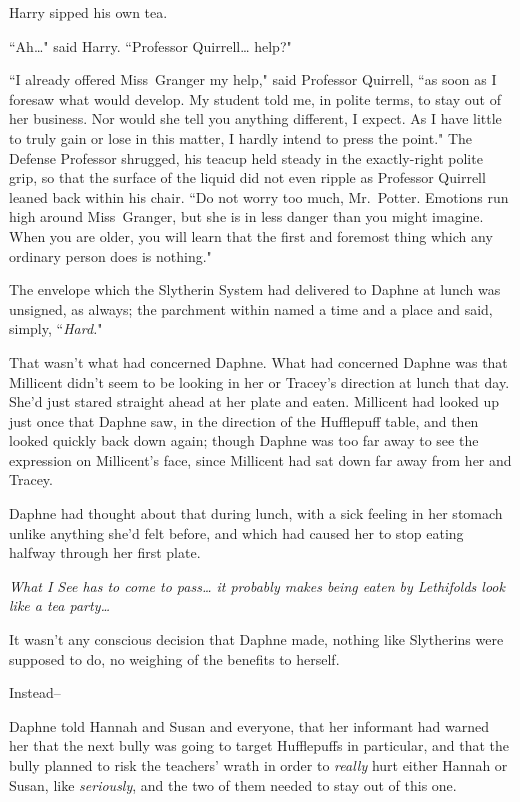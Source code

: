 Harry sipped his own tea.

``Ah{\ldots}" said Harry. ``Professor Quirrell{\ldots} help?"

``I already offered Miss~Granger my help," said Professor Quirrell, ``as soon as I foresaw what would develop. My student told me, in polite terms, to stay out of her business. Nor would she tell you anything different, I expect. As I have little to truly gain or lose in this matter, I hardly intend to press the point." The Defense Professor shrugged, his teacup held steady in the exactly-right polite grip, so that the surface of the liquid did not even ripple as Professor Quirrell leaned back within his chair. ``Do not worry too much, Mr.~Potter. Emotions run high around Miss~Granger, but she is in less danger than you might imagine. When you are older, you will learn that the first and foremost thing which any ordinary person does is nothing."

\later

The envelope which the Slytherin System had delivered to Daphne at lunch was unsigned, as always; the parchment within named a time and a place and said, simply, ``\emph{Hard.}"

That wasn't what had concerned Daphne. What had concerned Daphne was that Millicent didn't seem to be looking in her or Tracey's direction at lunch that day. She'd just stared straight ahead at her plate and eaten. Millicent had looked up just once that Daphne saw, in the direction of the Hufflepuff table, and then looked quickly back down again; though Daphne was too far away to see the expression on Millicent's face, since Millicent had sat down far away from her and Tracey.

Daphne had thought about that during lunch, with a sick feeling in her stomach unlike anything she'd felt before, and which had caused her to stop eating halfway through her first plate.

\emph{What I See has to come to pass{\ldots} it probably makes being eaten by Lethifolds look like a tea party{\ldots}}

It wasn't any conscious decision that Daphne made, nothing like Slytherins were supposed to do, no weighing of the benefits to herself.

Instead\---

Daphne told Hannah and Susan and everyone, that her informant had warned her that the next bully was going to target Hufflepuffs in particular, and that the bully planned to risk the teachers' wrath in order to \emph{really} hurt either Hannah or Susan, like \emph{seriously}, and the two of them needed to stay out of this one.


